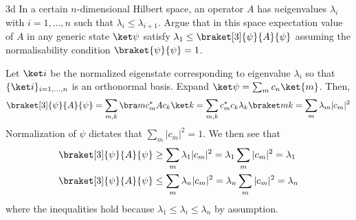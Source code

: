 \documentclass[12pt]{article}
\begin{document}
\begin{exc}{3d}
In a certain $n$-dimensional Hilbert space, an operator $A$ has $n $eigenvalues
$\lambda_i$ with $i = 1,\ldots, n$ such that $\lambda_i \leq \lambda_{i + 1}$. Argue that in this space expectation value of $A$ in any generic state $\ket \psi$ satisfy $\lambda_1 \leq \braket[3]{\psi}{A}{\psi}$ assuming the normalisability condition $\braket{\psi}{\psi} = 1$.
\end{exc}
\begin{ans}
Let $\ket i$ be the normalized eigenstate corresponding to eigenvalue $\lambda_i$ so that $\{\ket i\}_{i = 1, \ldots, n}$ is an orthonormal basis. Expand $\ket \psi = \sum_{m} c_n \ket{m}$. Then, 
\begin{align*}
    \braket[3]{\psi}{A}{\psi} 
    = \sum_{m,k}\bra m c_m^* A c_k \ket k
    = \sum_{m,k} c_m^* c_k\lambda_k \braket m k
    = \sum_{m} \lambda_{m} |c_m|^2 
\end{align*}
Normalization of $\psi$ dictates that $\sum_m|c_m|^2 = 1$. We then see that 
\begin{align*}
    \braket[3]{\psi}{A}{\psi} &\geq \sum_{m} \lambda_1 |c_m|^2 = \lambda_1 \sum_m |c_m|^2 = \lambda_1\\
     \braket[3]{\psi}{A}{\psi} &\leq \sum_{m} \lambda_n |c_m|^2 = \lambda_n \sum_m |c_m|^2 = \lambda_n
\end{align*}
where the inequalities hold because $\lambda_1 \leq \lambda_i \leq \lambda_n$ by assumption.
\end{ans}
\end{document}

